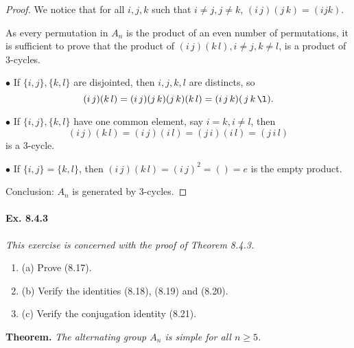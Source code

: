 \documentclass[11pt,a4paper]{article}
\newcommand{\be} {\begin{enumerate}}
\newcommand{\ee} {\end{enumerate}}
\begin{document}
\begin{proof}

We notice that for all $i,j,k$ such that $i \ne j, j \ne k$,  $(i\, j)(j \,k) = (i j k)$.

As every permutation in  $A_n$ is the product of an even number of permutations, it is sufficient to prove that the product of $(i \, j)(k \, l), i\neq j, k \neq l$, is a product of 3-cycles.



$\bullet$ If $\{i,j\} ,\{k,l\}$ are disjointed, then $i,j,k,l$ are distincts, so $$(i\, j)(k\, l) = (i\, j)(j\, k)(j\, k)(k\, l) =   (i \, j \, k) (\,j\, k\, \l).$$ 

$\bullet$ If $\{i,j\} ,\{k,l\}$ have one common element, say $i = k, i \neq l$, then $$(i\, j)(k\, l) = (i\, j)(i \,l) = (j\,i)(i\, l)= (j\, i \,l)$$ is a  3-cycle.

$\bullet$ If $\{i,j\} = \{k, l\}$, then $(i\,j)(k\,l) = (i \,j)^2 = ()= e$ is the empty product.

Conclusion: $A_n$ is generated by 3-cycles.
\end{proof}

\paragraph{Ex. 8.4.3}

{\it This exercise is concerned with the proof of Theorem 8.4.3.
\be
\item[(a)] Prove (8.17).
\item[(b)] Verify the identities (8.18), (8.19) and (8.20).
\item[(c)] Verify the conjugation identity (8.21).
\ee
}


{\bf Theorem.} {\it The alternating group $A_n$ is simple for all $n\geq 5$.}
\end{document}
